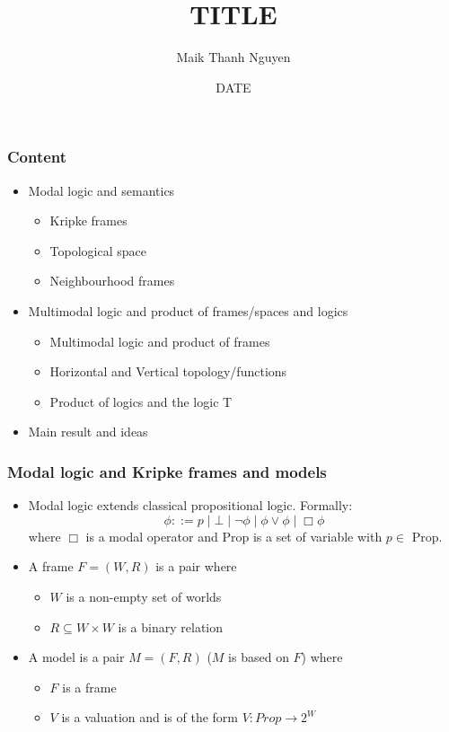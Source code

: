 \documentclass[hyperref={pdfpagelabels=false},t,10pt]{beamer}
\title{TITLE}
\author[© author]{Maik Thanh Nguyen}
\institute{Technische Universit\"at Dresden}
\date{DATE}
\begin{document}
\addtocounter{framenumber}{-1}
\maketitle

\begin{frame}
  \frametitle{Content}

  \begin{itemize}
  \item Modal logic and semantics
    \begin{itemize}
        \item Kripke frames
        \item Topological space
        \item Neighbourhood frames
     \end{itemize}
  \item Multimodal logic and product of frames/spaces and logics
    \begin{itemize}
      \item Multimodal logic and product of frames
      \item Horizontal and Vertical topology/functions
      \item Product of logics and the logic T
    \end{itemize}
  \item Main result and ideas
  \end{itemize}
\end{frame}

\begin{frame}
  \frametitle{Modal logic and Kripke frames and models}
  \begin{itemize}
    \item Modal logic extends classical propositional logic. Formally:
    $$\phi ::= p \mid \bot \mid \neg \phi \mid \phi \lor \phi \mid \Box \phi$$
    where $\Box$ is a modal operator and Prop is a set of variable with $p \in$ Prop.
     \pause

    \item A frame $F = (W,R)$ is a pair where 
    \begin{itemize}
      \item $W$ is a non-empty set of worlds
      \item $R \subseteq W \times W$ is a binary relation  
    \end{itemize}

    \item A model is a pair $M = (F,R)$ ($M$ is based on $F$) where
      \begin{itemize}
        \item $F$ is a frame
        \item $V$ is a valuation and is of the form $V : Prop \rightarrow 2^W$
      \end{itemize}
  \end{itemize}
\end{frame}
\end{document}
